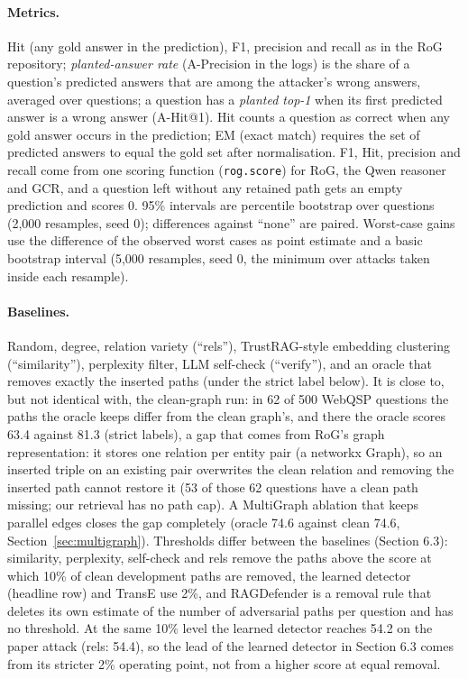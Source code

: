 \documentclass[preprint,12pt]{elsarticle}
\begin{document}
\paragraph{Metrics.} Hit (any gold answer in the prediction), F1, precision and recall as in the RoG repository; \emph{planted-answer rate} (A-Precision in the logs) is the share of a question's predicted answers that are among the attacker's wrong answers, averaged over questions; a question has a \emph{planted top-1} when its first predicted answer is a wrong answer (A-Hit@1). Hit counts a question as correct when any gold answer occurs in the prediction; EM (exact match) requires the set of predicted answers to equal the gold set after normalisation. F1, Hit, precision and recall come from one scoring function (\texttt{rog.score}) for RoG, the Qwen reasoner and GCR, and a question left without any retained path gets an empty prediction and scores 0. 95\% intervals are percentile bootstrap over questions (2{,}000 resamples, seed 0); differences against ``none'' are paired. Worst-case gains use the difference of the observed worst cases as point estimate and a basic bootstrap interval (5{,}000 resamples, seed 0, the minimum over attacks taken inside each resample).

\paragraph{Baselines.} Random, degree, relation variety (``rels''), TrustRAG-style embedding clustering (``similarity''), perplexity filter, LLM self-check (``verify''), and an oracle that removes exactly the inserted paths (under the strict label below). It is close to, but not identical with, the clean-graph run: in 62 of 500 WebQSP questions the paths the oracle keeps differ from the clean graph's, and there the oracle scores 63.4 against 81.3 (strict labels), a gap that comes from RoG's graph representation: it stores one relation per entity pair (a networkx Graph), so an inserted triple on an existing pair overwrites the clean relation and removing the inserted path cannot restore it (53 of those 62 questions have a clean path missing; our retrieval has no path cap). A MultiGraph ablation that keeps parallel edges closes the gap completely (oracle 74.6 against clean 74.6, Section~\ref{sec:multigraph}). Thresholds differ between the baselines (Section 6.3): similarity, perplexity, self-check and rels remove the paths above the score at which 10\% of clean development paths are removed, the learned detector (headline row) and TransE use 2\%, and RAGDefender is a removal rule that deletes its own estimate of the number of adversarial paths per question and has no threshold. At the same 10\% level the learned detector reaches 54.2 on the paper attack (rels: 54.4), so the lead of the learned detector in Section 6.3 comes from its stricter 2\% operating point, not from a higher score at equal removal.
\end{document}
